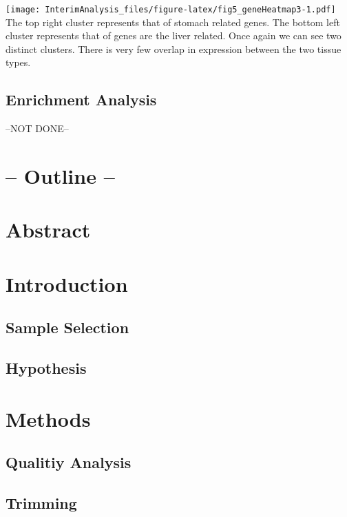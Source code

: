 \documentclass[
]{article}
\begin{document}
\texttt{[image: InterimAnalysis\_files/figure-latex/fig5\_geneHeatmap3-1.pdf]}
The top right cluster represents that of stomach related genes. The
bottom left cluster represents that of genes are the liver related. Once
again we can see two distinct clusters. There is very few overlap in
expression between the two tissue types.

\subsection{Enrichment Analysis}\label{enrichment-analysis-1}

--NOT DONE--

\newpage

\section{-- Outline --}\label{outline}

\section{Abstract}\label{abstract}

\section{Introduction}\label{introduction-1}

\subsection{Sample Selection}\label{sample-selection}

\subsection{Hypothesis}\label{hypothesis-1}

\section{Methods}\label{methods-1}

\subsection{Qualitiy Analysis}\label{qualitiy-analysis}

\subsection{Trimming}\label{trimming-1}
\end{document}
